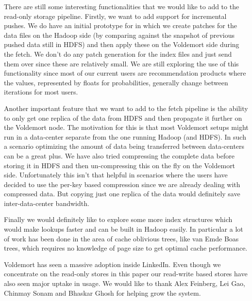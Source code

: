 \documentclass[10pt,twocolumn,preprint,natbib,authoryear]{sigplanconf}
\begin{document}
There are still some interesting functionalities that we would like to add to the read-only storage pipeline. Firstly, we want to add support for incremental pushes. We do have an initial prototype for in which we create patches for the data files on the Hadoop side (by comparing against the snapshot of previous pushed data still in HDFS) and then apply these on the Voldemort side during the fetch. We don't do any patch generation for the index files and just send them over since these are relatively small. We are still exploring the use of this functionality since most of our current users are recommendation products where the values, represented by floats for probabilities, generally change between iterations for most users. 

Another important feature that we want to add to the fetch pipeline is the ability to only get one replica of the data from HDFS and then propagate it further on the Voldemort node. The motivation for this is that most Voldemort setups might run in a data-center separate from the one running Hadoop (and HDFS). In such a scenario optimizing the amount of data being transferred between data-centers can be a great plus. We have also tried compressing the complete data before storing it in HDFS and then un-compressing this on the fly on the Voldemort side. Unfortunately this isn't that helpful in scenarios where the users have decided to use the per-key based compression since we are already dealing with compressed data. But copying just one replica of the data would definitely save inter-data-center bandwidth. 

Finally we would definitely like to explore some more index structures which would make lookups faster and can be built in Hadoop easily. In particular a lot of work has been done in the area of cache oblivious trees, like van Emde Boas trees, which requires no knowledge of page size to get optimal cache performance. 
 
\acks
Voldemort has seen a massive adoption inside LinkedIn. Even though we concentrate on the read-only stores in this paper our read-write based stores have also seen major uptake in usage. We would like to thank Alex Feinberg, Lei Gao, Chinmay Sonam and Bhaskar Ghosh for helping grow the system. 


\end{document}
